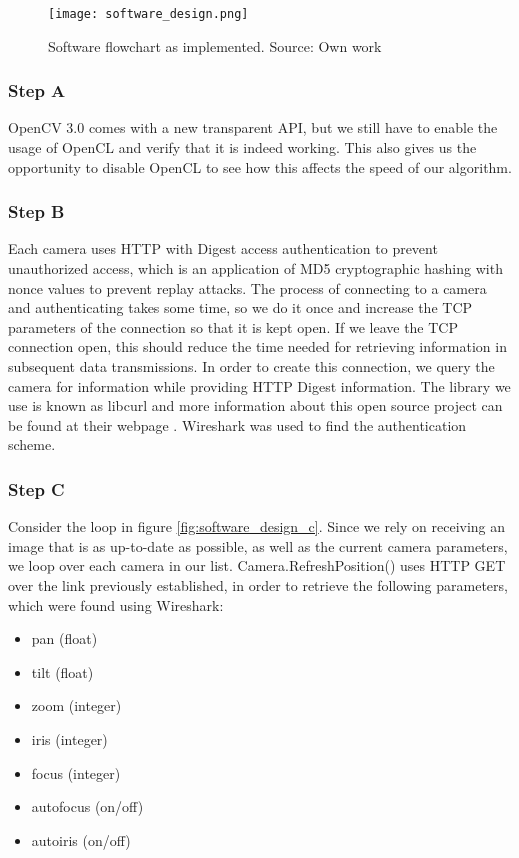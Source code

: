 \begin{figure}[ht]
    \centering
    \texttt{[image: software\_design.png]}
    \caption{Software flowchart as implemented. Source: Own work}
    \label{fig:software_design}
\end{figure}
\FloatBarrier

\subsubsection{Step A}
OpenCV 3.0 comes with a new transparent API, but we still have to enable the usage of OpenCL and verify that it is indeed working. This also gives us the opportunity to disable OpenCL to see how this affects the speed of our algorithm.
\subsubsection{Step B}
Each camera uses HTTP with Digest access authentication to prevent unauthorized access, which is an application of MD5 cryptographic hashing with nonce values to prevent replay attacks. The process of connecting to a camera and authenticating takes some time, so we do it once and increase the TCP parameters of the connection so that it is kept open. If we leave the TCP connection open, this should reduce the time needed for retrieving information in subsequent data transmissions. In order to create this connection, we query the camera for information while providing HTTP Digest information. The library we use is known as libcurl and more information about this open source project can be found at their webpage \citet{curl15}. Wireshark was used to find the authentication scheme.
\subsubsection{Step C}
Consider the loop in figure \ref{fig:software_design_c}.
Since we rely on receiving an image that is as up-to-date as possible, as well as the current camera parameters, we loop over each camera in our list. Camera.RefreshPosition() uses HTTP GET over the link previously established, in order to retrieve the following parameters, which were found using Wireshark:

\begin{itemize}
\item pan (float)
\item tilt (float)
\item zoom (integer)
\item iris (integer)
\item focus (integer)
\item autofocus (on/off)
\item autoiris (on/off)
\end{itemize}

